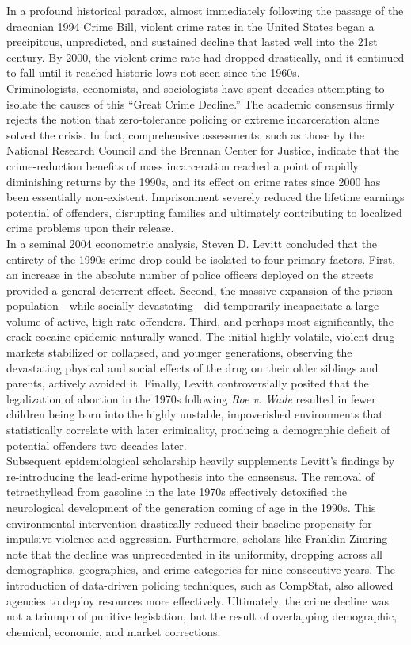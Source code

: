 \documentclass[
]{article}
\begin{document}
In a profound historical paradox, almost immediately following the
passage of the draconian 1994 Crime Bill, violent crime rates in the
United States began a precipitous, unpredicted, and sustained decline
that lasted well into the 21st century. By 2000, the violent crime rate
had dropped drastically, and it continued to fall until it reached
historic lows not seen since the 1960s.\\
Criminologists, economists, and sociologists have spent decades
attempting to isolate the causes of this ``Great Crime Decline.'' The
academic consensus firmly rejects the notion that zero-tolerance
policing or extreme incarceration alone solved the crisis. In fact,
comprehensive assessments, such as those by the National Research
Council and the Brennan Center for Justice, indicate that the
crime-reduction benefits of mass incarceration reached a point of
rapidly diminishing returns by the 1990s, and its effect on crime rates
since 2000 has been essentially non-existent. Imprisonment severely
reduced the lifetime earnings potential of offenders, disrupting
families and ultimately contributing to localized crime problems upon
their release.\\
In a seminal 2004 econometric analysis, Steven D. Levitt concluded that
the entirety of the 1990s crime drop could be isolated to four primary
factors. First, an increase in the absolute number of police officers
deployed on the streets provided a general deterrent effect. Second, the
massive expansion of the prison population---while socially
devastating---did temporarily incapacitate a large volume of active,
high-rate offenders. Third, and perhaps most significantly, the crack
cocaine epidemic naturally waned. The initial highly volatile, violent
drug markets stabilized or collapsed, and younger generations, observing
the devastating physical and social effects of the drug on their older
siblings and parents, actively avoided it. Finally, Levitt
controversially posited that the legalization of abortion in the 1970s
following \emph{Roe v. Wade} resulted in fewer children being born into
the highly unstable, impoverished environments that statistically
correlate with later criminality, producing a demographic deficit of
potential offenders two decades later.\\
Subsequent epidemiological scholarship heavily supplements Levitt's
findings by re-introducing the lead-crime hypothesis into the consensus.
The removal of tetraethyllead from gasoline in the late 1970s
effectively detoxified the neurological development of the generation
coming of age in the 1990s. This environmental intervention drastically
reduced their baseline propensity for impulsive violence and aggression.
Furthermore, scholars like Franklin Zimring note that the decline was
unprecedented in its uniformity, dropping across all demographics,
geographies, and crime categories for nine consecutive years. The
introduction of data-driven policing techniques, such as CompStat, also
allowed agencies to deploy resources more effectively. Ultimately, the
crime decline was not a triumph of punitive legislation, but the result
of overlapping demographic, chemical, economic, and market corrections.
\end{document}
